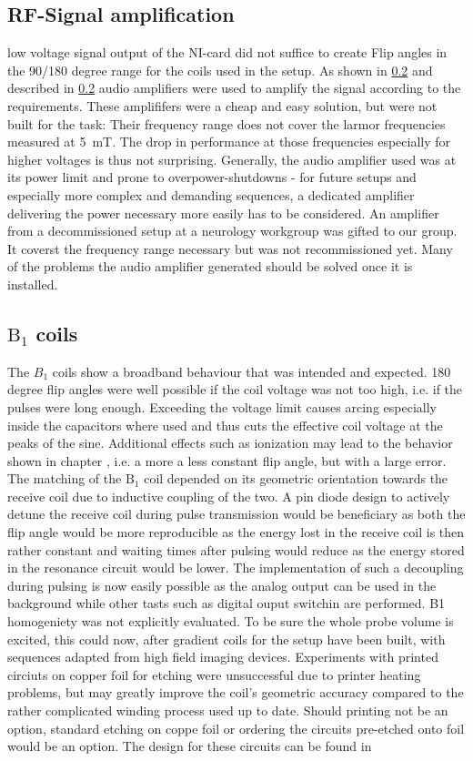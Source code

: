         \subsection{RF-Signal amplification}
            low voltage signal output of the NI-card did not suffice to create Flip angles in the 90/180 degree range for the coils used in the setup. As shown in \ref{} and described in \ref{} audio amplifiers were used to amplify the signal according to the requirements. These amplififers were a cheap and easy solution, but were not built for the task: Their frequency range does not cover the larmor frequencies measured at \SI{5}{\milli\tesla}. The drop in performance at those frequencies especially for higher voltages is thus not surprising. Generally, the audio amplifier used was at its power limit and prone to overpower-shutdowns - for future setups and especially more complex and demanding sequences, a dedicated amplifier delivering the power necessary more easily has to be considered.
            An amplifier from a decommissioned setup at a neurology workgroup was gifted to our group. It coverst the frequency range necessary but was not recommissioned yet. Many of the problems the audio amplifier generated should be solved once it is installed.
        \subsection{$\mathrm{B}_1$ coils}
            The $B_1$ coils show a broadband behaviour that was intended and expected. 180 degree flip angles were well possible if the coil voltage was not too high, i.e. if the pulses were long enough. Exceeding the voltage limit causes arcing especially inside the capacitors where used and thus cuts the effective coil voltage at the peaks of the sine. Additional effects such as ionization may lead to the behavior shown in chapter , i.e. a more a less constant flip angle, but with a large error.
            The matching of the $\mathrm{B_1}$ coil depended on its geometric orientation towards the receive coil due to inductive coupling of the two. A pin diode design to actively detune the receive coil during pulse transmission would be beneficiary as both the flip angle would be more reproducible as the energy lost in the receive coil is then rather constant and waiting times after pulsing would reduce as the energy stored in the resonance circuit would be lower. The implementation of such a decoupling during pulsing is now easily possible as the analog output can be used in the background while other tasts such as digital ouput switchin are performed.
            B1 homogeniety was not explicitly evaluated. To be sure the whole probe volume is excited, this could now, after gradient coils for the setup have been built, with sequences adapted from high field imaging devices.
            Experiments with printed circiuts on copper foil for etching were unsuccessful due to printer  heating problems, but may greatly improve the coil's geometric accuracy compared to the rather complicated winding process used up to date. Should printing not be an option, standard etching on coppe foil or ordering the circuits pre-etched onto foil would be an option.  The design for these circuits can be found in 
